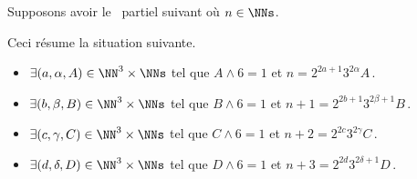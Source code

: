 \begin{example}
	Supposons avoir le \sftab\ partiel suivant où $n \in \NNs$.

	\begin{center}
	\end{center}

	Ceci résume la situation suivante.
	\begin{itemize}
		\item $\exists (a, \alpha, A) \in \NN^3 \times \NNs$
		      tel que $A \wedge 6 = 1$
		      et
		      $n     = 2^{2a+1} 3^{2\alpha} A$\,.

		\item $\exists (b, \beta, B) \in \NN^3 \times \NNs$
		      tel que $B \wedge 6 = 1$
		      et
		      $n + 1 = 2^{2b+1} 3^{2\beta+1} B$\,.

		\item $\exists (c, \gamma, C) \in \NN^3 \times \NNs$
		      tel que $C \wedge 6 = 1$
		      et
		      $n + 2 = 2^{2c} 3^{2\gamma} C$\,.

		\item $\exists (d, \delta, D) \in \NN^3 \times \NNs$
		      tel que $D \wedge 6 = 1$
		      et
		      $n + 3 = 2^{2d} 3^{2\delta+1} D$\,.
	\end{itemize}
\end{example}




